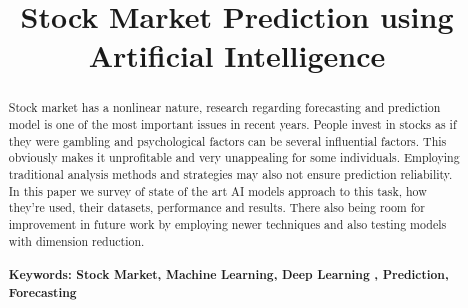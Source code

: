 \documentclass[conference]{IEEEtran}
\begin{document}
\title{Stock Market Prediction using \\Artificial Intelligence}
\author{
}
\maketitle
\begin{abstract}
Stock market has a nonlinear nature, research regarding forecasting and prediction model is one of the most important issues in recent years. 
People invest in stocks as if they were gambling and psychological factors can be several influential factors. This obviously makes it unprofitable 
and very unappealing for some individuals. Employing traditional analysis methods and strategies may also not ensure prediction reliability. In this 
paper we survey of state of the art AI models approach to this task, how they're used, their datasets, performance and results. There also being room 
for improvement in future work by employing newer techniques and also testing models with dimension reduction.
\\\\
\textbf{Keywords: Stock  Market,  Machine  Learning, Deep Learning , Prediction, Forecasting}
\end{abstract}
\IEEEpeerreviewmaketitle
\end{document}
